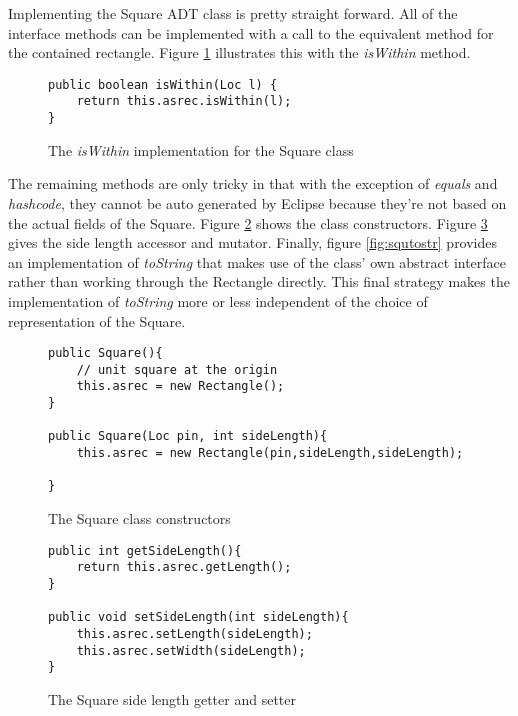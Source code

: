 \documentclass[]{tufte-handout}
\begin{document}
Implementing the Square ADT class is pretty straight forward. All of the interface methods can be implemented with a call to the equivalent method for the contained rectangle. Figure \ref{fig:squiswithin} illustrates this with the \textit{isWithin} method.

\begin{figure}
\begin{lstlisting}
public boolean isWithin(Loc l) {
	return this.asrec.isWithin(l);
}
\end{lstlisting}
\label{fig:squiswithin}
\caption{The \textit{isWithin} implementation for the Square class}
\end{figure}

The remaining methods are only tricky in that with the exception of \textit{equals} and \textit{hashcode}, they cannot be auto generated by Eclipse because they're not based on the actual fields of the Square. Figure \ref{fig:squctor} shows the class constructors. Figure \ref{fig:squgetset} gives the side length accessor and mutator. Finally, figure \ref{fig:squtostr} provides an implementation of \textit{toString} that makes use of the class' own abstract interface rather than working through the Rectangle directly. This final strategy makes the implementation of \textit{toString} more or less independent of the choice of representation of the Square. 

\begin{figure}
\begin{lstlisting}
public Square(){
	// unit square at the origin
	this.asrec = new Rectangle();
}	
	
public Square(Loc pin, int sideLength){
	this.asrec = new Rectangle(pin,sideLength,sideLength);
	
}
\end{lstlisting}
\label{fig:squctor}
\caption{The Square class constructors}
\end{figure}

\begin{figure}
\begin{lstlisting}
public int getSideLength(){
	return this.asrec.getLength();
}
	
public void setSideLength(int sideLength){
	this.asrec.setLength(sideLength);
	this.asrec.setWidth(sideLength);
}
\end{lstlisting}
\label{fig:squgetset}
\caption{The Square side length getter and setter}
\end{figure}
\end{document}
